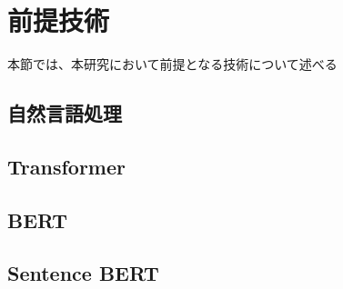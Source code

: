


\section{前提技術}
本節では、本研究において前提となる技術について述べる

\subsection{自然言語処理}

\subsection{Transformer}

\subsection{BERT}

\subsection{Sentence BERT}


